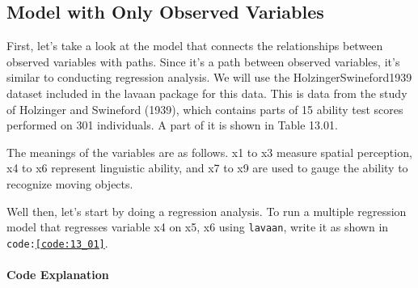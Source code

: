 \documentclass{ltjsbook}
\begin{document}
\subsection{Model with Only Observed Variables}
First, let's take a look at the model that connects the relationships between observed variables with paths. Since it’s a path between observed variables, it’s similar to conducting regression analysis.
We will use the HolzingerSwineford1939 dataset included in the lavaan package for this data. This is data from the study of Holzinger and Swineford (1939), which contains parts of 15 ability test scores performed on 301 individuals. A part of it is shown in Table 13.01.

The meanings of the variables are as follows. x1 to x3 measure spatial perception, x4 to x6 represent linguistic ability, and x7 to x9 are used to gauge the ability to recognize moving objects.


Well then, let's start by doing a regression analysis. To run a multiple regression model that regresses variable x4 on x5, x6 using \texttt{lavaan}, write it as shown in \texttt{code:\ref{code:13_01}}.



\paragraph{Code Explanation}

\end{document}
